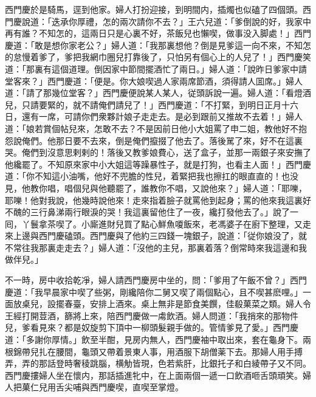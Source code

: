 西門慶於是騎馬，逕到他家。婦人打扮迎接，到明間内，插燭也似磕了四個頭。西門慶說道：「迭承你厚禮，怎的兩次請你不去？」王六兒道：「爹倒說的好，我家中再有誰？不知怎的，這兩日只是心裏不好，茶飯兒也懶喫，做事没入脚處！」西門慶道：「敢是想你家老公？」婦人道：「我那裏想他？倒是見爹這一向不來，不知怎的怠慢着爹了，爹把我網巾圈兒打靠後了，只怕另有個心上的人兒了！」西門慶笑道：「那裏有這個道理。倒因家中節間擺酒忙了兩日。」婦人道：「說昨日爹家中請堂客來？」西門慶道：「便是。你大娘喫過人家兩席節酒，須得請人囬席。」婦人道：「請了那幾位堂客？」西門慶便說某人某人，従頭訴說一遍。婦人道：「看燈酒兒，只請要緊的，就不請俺們請兒了！」西門慶道：「不打緊，到明日正月十六日，還有一席，可請你們衆夥計娘子走走去。是必到跟前又推故不去着！」婦人道：「娘若賞個帖兒來，怎敢不去？不是因前日他小大姐罵了申二姐，教他好不抱怨說俺們。他那日要不去來，倒是俺們攛掇了他去了。落後駡了來，好不在這裏哭。俺們到沒意思剌剌的！落後又教爹娘費心，送了盒子，並那一兩銀子來安撫了他纔罷了。不知原來家中小大姐這等躁暴性子，就是打狗，也看主人面！」西門慶道：「你不知這小油嘴，他好不兜膽的性兒，着緊把我也擦扛的眼直直的！也没見，他教你唱，唱個兒與他聽罷了，誰教你不唱，又說他來？」婦人道：「耶嚛，耶嚛！他對我說，他幾時說他來！走來指着臉子就罵他到起身；罵的他來我這裏好不醜的三行鼻涕兩行眼淚的哭！我這裏留他住了一夜，纔打發他去了。」說了一囘，丫鬟拿茶喫了。小廝進財兒買了點心鮮魚嗄飯來，老馮婆子在廚下整理，又走來上邊與西門慶磕頭。西門慶與了他約三四錢一塊銀子，說道：「従你娘没了，就不常往我那裏走走去？」婦人道：「沒他的主兒，那裏着落？倒常時來我這邊和我做伴兒。」

不一時，房中收拾乾凈，婦人請西門慶房中坐的，問：「爹用了午飯不曾？」西門慶道：「我早晨家中喫了些粥，剛纔陪你二舅又喫了兩個點心，且不喫甚麽哩。」一面放桌兒，設擺春臺，安排上酒來。桌上無非是節食美饌，佳殽菓菜之類。婦人令王經打開荳酒，篩將上來，陪西門慶做一䖏飲酒。婦人問道：「我捎來的那物件兒，爹看見來？都是奴旋剪下頂中一柳頭髮親手做的。管情爹見了愛。」西門慶道：「多謝你厚情。」飲至半酣，見房内無人，西門慶袖中取出來，套在龜身下。兩根錦帶兒扎在腰間，龜頭又帶着景東人事，用酒服下胡僧薬下去。那婦人用手搏弄，弄的那話登時奢稜跳腦，横觔皆現，色若紫肝，比銀托子和白綾帶子又不同。西門慶摟婦人坐在懷内，那話插進牝中，在上面兩個一遞一口飲酒咂舌頭頑笑。婦人把菓仁兒用舌尖哺與西門慶喫，直喫至掌燈。

